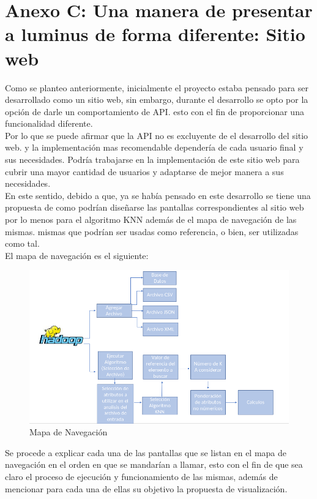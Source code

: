 \section{Anexo C: Una manera de presentar a luminus de forma diferente: Sitio web}\label{sitioweb}
Como se planteo anteriormente, inicialmente el proyecto estaba pensado para ser desarrollado como un sitio web, sin embargo, durante el desarrollo se opto por la opción de darle un comportamiento de API. esto con el fin de proporcionar una funcionalidad diferente. \\
Por lo que se puede afirmar que la API no es excluyente de el desarrollo del sitio web. y la implementación mas recomendable dependería de cada usuario final y sus necesidades. Podría trabajarse en la implementación de este sitio web para cubrir una mayor cantidad de usuarios y adaptarse de mejor manera a sus necesidades.\\
En este sentido, debido a que, ya se había pensado en este desarrollo se tiene una propuesta de como podrían diseñarse las pantallas correspondientes al sitio web por lo menos para el algoritmo KNN además de el mapa de navegación de las mismas. mismas que podrían ser usadas como referencia, o bien, ser utilizadas como tal.\\
El mapa de navegación es el siguiente:\\
\begin{figure}[H]
	\hypertarget{fig:red}{\hspace{1pt}}
	\begin{center}
		\includegraphics[width=.9\textwidth]{capitulo7/images/mapadenavegacion.png}
		\caption{Mapa de Navegación}
		\label{fig:mapanav}
	\end{center}
\end{figure}
\newpage
Se procede a explicar cada una de las pantallas que se listan en el mapa de navegación en el orden en que se mandarían a llamar, esto con el fin de que sea claro el proceso de ejecución y funcionamiento de las mismas, además de mencionar para cada una de ellas su objetivo la propuesta de visualización.\\
